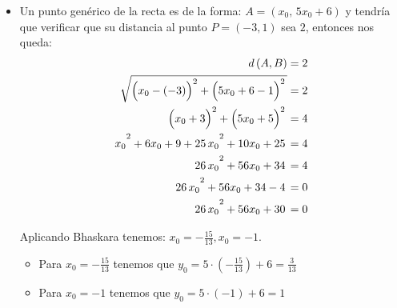 \documentclass[11pt]{article}
\begin{document}
\begin{enumerate}[\hspace{-5mm} 1) ]
\begin{itemize}
    \item Un punto genérico de la recta es de la forma: $A=(x_0,\, 5x_0   + 6 )$ y tendría que verificar que su distancia al punto $P= (-3,1)$ sea $2$, entonces nos queda:
    \begin{align*}
       d \left( A,B\right)
       &= 2
       \\
       \sqrt{\left( x_0-(-3) \rule{0mm}{3.6mm} \right)^2 + \left( 5x_0   + 6 -1 \rule{0mm}{3.6mm}\right)^2 \, }
       &= 2
       \\
       \left( x_0+3 \rule{0mm}{3.6mm} \right)^2 + \left( 5x_0   + 5\rule{0mm}{3.6mm}\right)^2 \, 
       &= 4
       \\
       x_0\rule{0mm}{3.5mm}^2 + 6 x_0 +9 + 25\, x_0\rule{0mm}{3.5mm}^2   +10 x_0 +25  \, 
       &= 4
       \\
        26\, x_0\rule{0mm}{3.5mm}^2 + 56 x_0 + 34 \, 
       &= 4
       \\
        26\, x_0\rule{0mm}{3.5mm}^2 + 56 x_0 + 34-4 \, 
       &= 0
       \\
        26\, x_0\rule{0mm}{3.5mm}^2 + 56 x_0 + 30 \, 
       &= 0
    \end{align*}


    Aplicando Bhaskara tenemos: $x_0= -\tfrac{15}{13}, x_0= -1$.


\begin{itemize}
    \item Para $x_0= -\tfrac{15}{13}$ tenemos que $y_0= 5\cdot (-\tfrac{15}{13}) +6= \tfrac{3}{13}$

    \item Para $x_0= -1$ tenemos que $y_0= 5\cdot (-1) +6= 1 $
\end{itemize}

    
    
\end{itemize}



\begin{center}
\end{center}
\end{enumerate}
\end{document}
